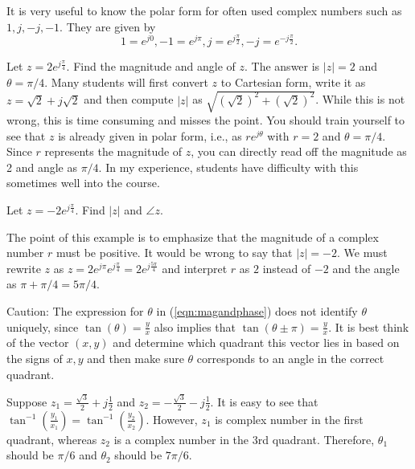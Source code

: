 \begin{example}
It is very useful to know the polar form for often used complex numbers such as $1,j,-j,-1$. They are given by
\[
\boxed{1 = e^{j0}, -1 = e^{j \pi}, j = e^{j \frac{\pi}{2}}, -j = e^{-j \frac{\pi}{2}}}.
\]
\end{example}

\begin{example}
Let $z = 2 e^{j \frac{\pi}{4}}$. Find the magnitude and angle of $z$. The answer is $|z|=2$ and $\theta = \pi/4$. Many students will first convert $z$ to Cartesian form, write it as $z = \sqrt{2} + j \sqrt{2}$ and then compute $|z|$ as $\sqrt{(\sqrt{2})^2+(\sqrt{2})^2}$. While this is not wrong, this is time consuming and misses the point. You should train yourself to see that $z$ is already given in polar form, i.e., as $r e^{j \theta}$ with $r = 2$ and $\theta = \pi/4$. Since $r$ represents the magnitude of $z$, you can directly read off the magnitude as 2 and angle as $\pi/4$. In my experience, students have difficulty with this sometimes well into the course.
\end{example}

\begin{example}
Let $z = -2 e^{j \frac{\pi}{4}}$. Find $|z|$ and $\angle z$.

The point of this example is to emphasize that the magnitude of a complex number $r$ must be positive.
It would be wrong to say that $|z| = -2$.
We must rewrite $z$ as $z = 2 e^{j \pi} e^{j \frac{\pi}{4}} = 2 e^{j \frac{5 \pi}{4}}$ and interpret $r$ as $2$ instead of $-2$ and the angle as $\pi + \pi/4 = 5 \pi/4$.
\end{example}


Caution: The expression for $\theta$ in (\ref{eqn:magandphase}) does not identify $\theta$ uniquely, since $\tan(\theta) = \frac{y}{x}$ also implies
that $\tan(\theta \pm \pi) = \frac{y}{x}$. It is best think of the vector $(x,y)$ and determine which quadrant this vector
lies in based on the signs of $x,y$ and then make sure $\theta$ corresponds to an angle in the correct quadrant.


\begin{example}
Suppose $z_1 = \frac{\sqrt{3}}{2}+j\frac{1}{2}$ and $z_2 = -\frac{\sqrt{3}}{2}-j\frac{1}{2}$. It is easy to see that $\tan^{-1}\left(\frac{y_1}{x_1} \right)
= \tan^{-1}\left(\frac{y_2}{x_2} \right)$. However, $z_1$ is complex number in the first quadrant, whereas $z_2$ is a complex number in the 3rd quadrant. Therefore, $\theta_1$ should be $\pi/6$ and $\theta_2$ should be $7 \pi/6$.
\end{example}

